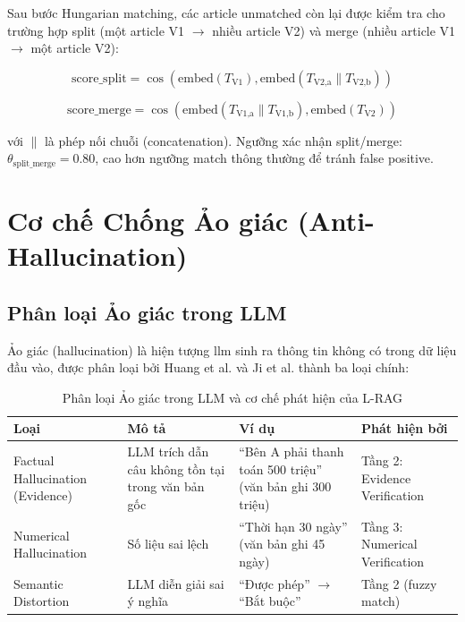 Sau bước Hungarian matching, các article unmatched còn lại được kiểm tra cho trường hợp split (một article V1 $\rightarrow$ nhiều article V2) và merge (nhiều article V1 $\rightarrow$ một article V2):

\begin{equation}
    \text{score\_split} = \cos(\text{embed}(T_{\text{V1}}), \text{embed}(T_{\text{V2,a}} \parallel T_{\text{V2,b}}))
    \label{eq:split_merge}
\end{equation}

\begin{equation}
    \text{score\_merge} = \cos(\text{embed}(T_{\text{V1,a}} \parallel T_{\text{V1,b}}), \text{embed}(T_{\text{V2}}))
    \label{eq:merge}
\end{equation}

với $\parallel$ là phép nối chuỗi (concatenation). Ngưỡng xác nhận split/merge: $\theta_{\text{split\_merge}} = 0.80$, cao hơn ngưỡng match thông thường để tránh false positive.

\section{Cơ chế Chống Ảo giác (Anti-Hallucination)}

\subsection{Phân loại Ảo giác trong LLM}

Ảo giác (hallucination) là hiện tượng \gls{llm} sinh ra thông tin không có trong dữ liệu đầu vào, được phân loại bởi Huang et al. \cite{huang2025survey} và Ji et al. \cite{ji2023survey} thành ba loại chính:

\begin{table}[H]
    \centering
    \caption{Phân loại Ảo giác trong LLM và cơ chế phát hiện của L-RAG}
    \label{tab:hallucination_types}
    \begin{tabularx}{\textwidth}{X X X X}
        \toprule
        \textbf{Loại} & \textbf{Mô tả} & \textbf{Ví dụ} & \textbf{Phát hiện bởi}\\
        \midrule
        Factual Hallucination (Evidence) & LLM trích dẫn câu không tồn tại trong văn bản gốc & ``Bên A phải thanh toán 500 triệu'' (văn bản ghi 300 triệu) & Tầng 2: Evidence Verification\\
        Numerical Hallucination & Số liệu sai lệch & ``Thời hạn 30 ngày'' (văn bản ghi 45 ngày) & Tầng 3: Numerical Verification\\
        Semantic Distortion & LLM diễn giải sai ý nghĩa & ``Được phép'' $\rightarrow$ ``Bắt buộc'' & Tầng 2 (fuzzy match)\\
        \bottomrule
    \end{tabularx}
\end{table}

